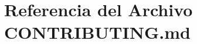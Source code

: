 \hypertarget{_c_o_n_t_r_i_b_u_t_i_n_g_8md}{}\section{Referencia del Archivo C\+O\+N\+T\+R\+I\+B\+U\+T\+I\+N\+G.\+md}
\label{_c_o_n_t_r_i_b_u_t_i_n_g_8md}
